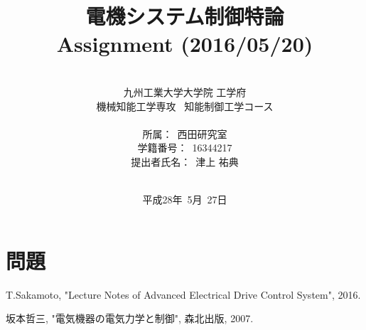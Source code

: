 \documentclass[a4paper,12pt]{jarticle}
\title{電機システム制御特論 \\
Assignment (2016/05/20)\\
}
\author{\vspace{40mm}\\
九州工業大学大学院 \hspace{0mm} 工学府\\
機械知能工学専攻\ \hspace{0mm} 知能制御工学コース \\
\vspace{5mm}\\
所属：\ 西田研究室\\
学籍番号：\ 16344217\\
提出者氏名：\ 津上 \hspace{0mm} 祐典\\\vspace{5mm}\\ }
\date{平成28年\ 5月\ 27日}
\begin{document}
\titlepage
\maketitle
\thispagestyle{empty}

\newpage

\thispagestyle{empty}
\tableofcontents

\newpage
\setcounter{page}{1}
\section{問題}

%
\begin{thebibliography}{99}

  T.Sakamoto,
		 "Lecture Notes of Advanced Electrical Drive Control System", 2016.

  坂本哲三, "電気機器の電気力学と制御", 森北出版, 2007.

\end{thebibliography}
\end{document}
